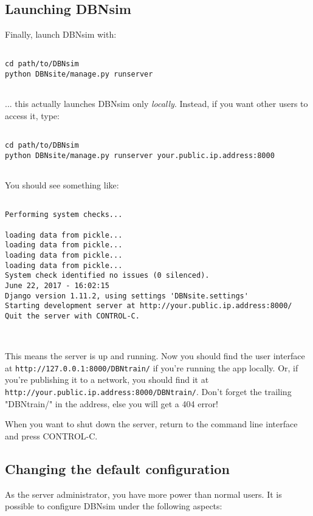 \documentclass[a4paper]{article}
\begin{document}
		
	\subsection{Launching DBNsim}

		
Finally, launch DBNsim with:
		\begin{verbatim}

cd path/to/DBNsim
python DBNsite/manage.py runserver
		
\end{verbatim}

		
... this actually launches DBNsim only \emph{locally}. Instead, if you want other users to access it, type:
		\begin{verbatim}

cd path/to/DBNsim
python DBNsite/manage.py runserver your.public.ip.address:8000
		
\end{verbatim}

		
You should see something like:
		\begin{verbatim}

Performing system checks...

loading data from pickle...
loading data from pickle...
loading data from pickle...
loading data from pickle...
System check identified no issues (0 silenced).
June 22, 2017 - 16:02:15
Django version 1.11.2, using settings 'DBNsite.settings'
Starting development server at http://your.public.ip.address:8000/
Quit the server with CONTROL-C.

		
\end{verbatim}

		
This means the server is up and running. Now you should find the user interface at \texttt{http://127.0.0.1:8000/DBNtrain/} if you're running the app locally. Or, if you're publishing it to a network, you should find it at \texttt{http://your.public.ip.address:8000/DBNtrain/}. Don't forget the trailing "DBNtrain/" in the address, else you will get a 404 error!
		
When you want to shut down the server, return to the command line interface and press CONTROL-C.

		
	\subsection{Changing the default configuration}

		
As the server administrator, you have more power than normal users. It is possible to configure DBNsim under the following aspects:
		
\end{document}
